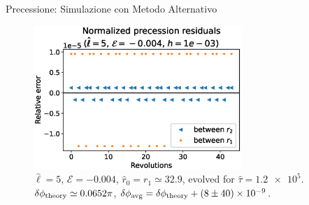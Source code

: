 \begin{frame}{Precessione: Simulazione con Metodo Alternativo}

    \begin{figure}[h]
        \centering
        \includegraphics[width=0.7\textwidth]{Figures/ch2/prec1_res_corr.eps}
        \caption{$\hat \ell = 5$, $\mathcal E = -0.004$, $\hat r_0 = r_1
        \simeq 32.9$, evolved for $\hat \tau = \num{1.2e5}$.
        $\delta \phi_{\rm theory} \simeq 0.0652 \pi$, 
        $\delta \phi_{\rm avg} = \delta \phi_{\rm theory} + (8 \pm 40) \times 
        \num{e-9}$.}
    \end{figure}

\end{frame}


